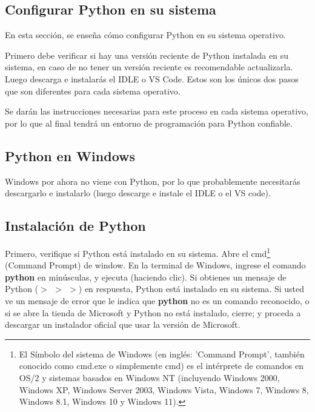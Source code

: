 \subsection{Configurar Python en su sistema}

En esta sección, se enseña cómo configurar Python en su sistema operativo.

Primero debe verificar si hay una versión reciente de Python instalada en su sistema, en caso de no tener un versión reciente 
es recomendable actualizarla. Luego descarga e instalarás el IDLE o VS Code. Estos son los únicos dos pasos que son diferentes para cada sistema operativo.


Se darán las instrucciones necesarias para este proceso en  cada  sistema operativo, por lo que al final tendrá un entorno de 
programación para Python confiable.

\subsection{Python en Windows}


%

Windows por ahora no viene con Python, por lo que probablemente necesitarás descargarlo e
instalarlo (luego descarge e instale el IDLE o el VS code).

\subsection{Instalación de Python}\label{instalarPY} 

Primero, verifique si Python está instalado en su sistema. Abre el cmd\footnote{\scriptsize{El Símbolo del sistema de Windows (en inglés: 'Command Prompt', también conocido como cmd.exe o simplemente cmd) es el intérprete de comandos en OS/2 y sistemas basados en Windows NT (incluyendo Windows 2000, Windows XP, Windows Server 2003, Windows Vista, Windows 7, Windows 8, Windows 8.1, Windows 10 y Windows 11).}} (Command Prompt) de window. En la  terminal de Windows, ingrese el comando {\bf{python}} en minúsculas,  y ejecuta (haciendo clic). Si obtienes un  mensaje de Python ({\bf{\tiny $>$\!\! $>$\!\! $>$}}) en respuesta, Python está instalado en su sistema. 
Si usted ve un mensaje de error que le indica que  {\bf{python}}  no es un comando reconocido,  o si se abre la tienda de Microsoft y Python no está instalado, cierre; y proceda a descargar un instalador oficial que usar la versión de Microsoft.\\



